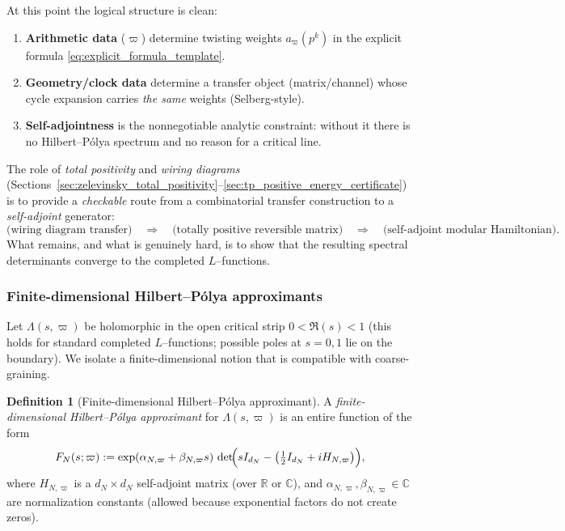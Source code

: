 \documentclass[11pt,oneside]{amsbook}
\numberwithin{equation}{section}
\theoremstyle{plain}
\theoremstyle{definition}
\newtheorem{definition}[theorem]{Definition}
\theoremstyle{remark}
\newcommand{\R}{\mathbb{R}}
\newcommand{\C}{\mathbb{C}}
\begin{document}
At this point the logical structure is clean:

\begin{enumerate}[label=(\roman*)]
\item \textbf{Arithmetic data} ($\varpi$) determine twisting weights $a_\varpi(p^k)$ in the explicit formula \eqref{eq:explicit_formula_template}.
\item \textbf{Geometry/clock data} determine a transfer object (matrix/channel) whose cycle expansion carries \emph{the same} weights (Selberg-style).
\item \textbf{Self-adjointness} is the nonnegotiable analytic constraint: without it there is no Hilbert--Pólya spectrum and no reason for a critical line.
\end{enumerate}

The role of \emph{total positivity} and \emph{wiring diagrams} (Sections~\ref{sec:zelevinsky_total_positivity}--\ref{sec:tp_positive_energy_certificate}) is to provide a \emph{checkable} route from a combinatorial transfer construction to a \emph{self-adjoint} generator:
\[
\text{(wiring diagram transfer)}\quad\Longrightarrow\quad
\text{(totally positive reversible matrix)}\quad\Longrightarrow\quad
\text{(self-adjoint modular Hamiltonian)}.
\]
What remains, and what is genuinely hard, is to show that the resulting spectral determinants converge to the completed $L$--functions.

\subsubsection{Finite-dimensional Hilbert--Pólya approximants}

Let $\Lambda(s,\varpi)$ be holomorphic in the open critical strip $0<\Re(s)<1$ (this holds for standard completed $L$--functions; possible poles at $s=0,1$ lie on the boundary).
We isolate a finite-dimensional notion that is compatible with coarse-graining.

\begin{definition}[Finite-dimensional Hilbert--Pólya approximant]
\label{def:hp_approximant}
A \emph{finite-dimensional Hilbert--Pólya approximant} for $\Lambda(s,\varpi)$ is an entire function of the form
\begin{equation}
\label{eq:hp_approximant}
F_N(s;\varpi):=\exp(\alpha_{N,\varpi}+\beta_{N,\varpi}s)\,
\det\!\Bigl(sI_{d_N}-\bigl(\tfrac12 I_{d_N}+ i H_{N,\varpi}\bigr)\Bigr),
\end{equation}
where $H_{N,\varpi}$ is a $d_N\times d_N$ self-adjoint matrix (over $\R$ or $\C$), and $\alpha_{N,\varpi},\beta_{N,\varpi}\in\C$ are normalization constants (allowed because exponential factors do not create zeros).
\end{definition}
\end{document}
